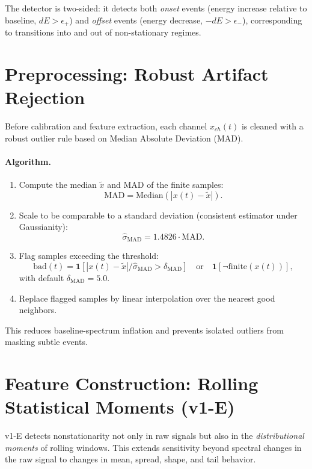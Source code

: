 \documentclass{article}
\begin{document}
The detector is two-sided: it detects both \emph{onset} events (energy increase relative to baseline, $dE > \epsilon_+$) and \emph{offset} events (energy decrease, $-dE > \epsilon_-$), corresponding to transitions into and out of non-stationary regimes.

\section{Preprocessing: Robust Artifact Rejection}
Before calibration and feature extraction, each channel $x_{ch}(t)$ is cleaned with a robust outlier rule based on Median Absolute Deviation (MAD).

\paragraph{Algorithm.}
\begin{enumerate}
  \item Compute the median $\tilde{x}$ and MAD of the finite samples:
  \[
    \mathrm{MAD} = \mathrm{Median}\!\left(\left|x(t) - \tilde{x}\right|\right).
  \]
  \item Scale to be comparable to a standard deviation (consistent estimator under Gaussianity):
  \[
    \hat{\sigma}_{\mathrm{MAD}} = 1.4826\cdot\mathrm{MAD}.
  \]
  \item Flag samples exceeding the threshold:
  \[
    \mathrm{bad}(t) = \mathbf{1}\!\left[\left|x(t)-\tilde{x}\right| / \hat{\sigma}_{\mathrm{MAD}} > \delta_{\mathrm{MAD}}\right]
    \quad\text{or}\quad \mathbf{1}[\neg\mathrm{finite}(x(t))],
  \]
  with default $\delta_{\mathrm{MAD}} = 5.0$.
  \item Replace flagged samples by linear interpolation over the nearest good neighbors.
\end{enumerate}

This reduces baseline-spectrum inflation and prevents isolated outliers from masking subtle events.

\section{Feature Construction: Rolling Statistical Moments (v1-E)}
v1-E detects nonstationarity not only in raw signals but also in the \emph{distributional moments} of rolling windows. This extends sensitivity beyond spectral changes in the raw signal to changes in mean, spread, shape, and tail behavior.
\end{document}

